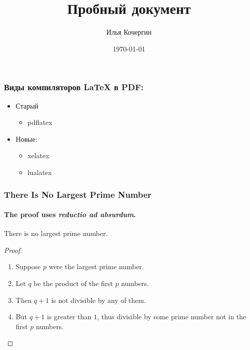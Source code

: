 \documentclass{beamer}
\author{Илья Кочергин}
\title{Пробный документ}
\date{\today}
\institute[кафедра ЭИ]{кафедра Экономической информатии }
\begin{document}
 
 \begin{frame}
 	\titlepage
\end{frame}
 
\begin{frame}
\frametitle{Виды \alert{компиляторов} \LaTeX{} в PDF:}

\begin{itemize}
\item Старый
    \begin{itemize}
     	\item pdflatex
     \end{itemize}
\item Новые:
     \begin{itemize}
     	\item xelatex
     	\item lualatex
     \end{itemize}
	
\end{itemize}
	
\end{frame}  
  
 \begin{frame}
 	\frametitle{There Is No Largest Prime Number}
 	\framesubtitle{The proof uses \textit{reductio ad absurdum}.}
 	\begin{theorem}
 		There is no largest prime number.
 	\end{theorem}
 	\begin{proof}
 		\begin{enumerate}
 			\item<1-| alert@1> Suppose $p$ were the largest prime number.
 			\item<2-> Let $q$ be the product of the first $p$ numbers.
 			\item<3-> Then $q+1$ is not divisible by any of them.
 			\item<1-> But $q + 1$ is greater than $1$, thus divisible by some prime
 			number not in the first $p$ numbers.\qedhere
 		\end{enumerate}
 	\end{proof}
 \end{frame} 
\end{document}
